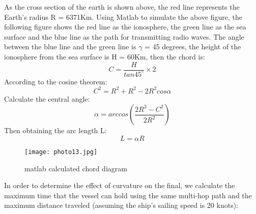 \documentclass{mcmthesis}
\begin{document}
As the cross section of the earth is shown above, the red line represents the Earth's radius R = 6371Km. Using Matlab to simulate the above figure, the following figure shows the red line as the ionosphere, the green line as the sea surface and the blue line as the path for transmitting radio waves. The angle between the blue line and the green line is $\gamma$ = 45 degrees, the height of the ionosphere from the sea surface is H = 60Km, then the chord is:
\begin{equation}
C=\frac{H}{tan45^\circ}\times2
\end{equation}
According to the cosine theorem:
\begin{equation}
C^2=R^2+R^2-2R^2cos\alpha
\end{equation}
Calculate the central angle:
\begin{equation}
\alpha=arccos(\frac{2R^2-C^2}{2R^2})
\end{equation}
Then obtaining the arc length L:
\begin{equation}
L=\alpha{R}
\end{equation}
\begin{figure}[h]
\small
\centering
\texttt{[image: photo13.jpg]}
\caption{matlab calculated chord diagram} \label{fig:aa}
\end{figure}
In order to determine the effect of curvature on the final, we calculate the maximum time that the vessel can hold using the same multi-hop path and the maximum distance traveled (assuming the ship's sailing speed is 20 knots):
\end{document}
